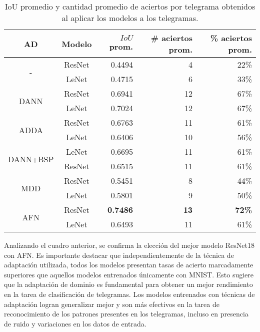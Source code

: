 \begin{table}[H]
    \centering
    \begin{tabular}{cc|rrr}
        \toprule
        AD                           & Modelo & $IoU$ prom.     & \# aciertos prom. & \% aciertos prom. \\
        \midrule
        \multirow[c]{2}{*}{-}        & ResNet & 0.4494          & 4                 & 22\%              \\
                                     & LeNet  & 0.4715          & 6                 & 33\%              \\\hline
        \multirow[c]{2}{*}{DANN}     & ResNet & 0.6941          & 12                & 67\%              \\
                                     & LeNet  & 0.7024          & 12                & 67\%              \\\hline
        \multirow[c]{2}{*}{ADDA}     & ResNet & 0.6763          & 11                & 61\%              \\
                                     & LeNet  & 0.6406          & 10                & 56\%              \\\hline
        \multirow[c]{2}{*}{DANN+BSP} & LeNet  & 0.6695          & 11                & 61\%              \\
                                     & ResNet & 0.6515          & 11                & 61\%              \\\hline
        \multirow[c]{2}{*}{MDD}      & ResNet & 0.5451          & 8                 & 44\%              \\
                                     & LeNet  & 0.5801          & 9                 & 50\%              \\\hline
        \multirow[c]{2}{*}{AFN}      & ResNet & \textbf{0.7486} & \textbf{13}       & \textbf{72\%}     \\
                                     & LeNet  & 0.6493          & 11                & 61\%              \\
        \bottomrule
    \end{tabular}
    \caption[IoU y aciertos por modelo]{IoU promedio y cantidad promedio de aciertos por telegrama obtenidos al aplicar los modelos a los telegramas.}
    \label{tab:iou-cant-aciertos-en-telegramas}
\end{table}

Analizando el cuadro anterior, se confirma la elección del mejor modelo ResNet18 con AFN. Es importante destacar que
independientemente de la técnica de adaptación utilizada, todos los modelos presentan tasas de acierto marcadamente
superiores que aquellos modelos entrenados únicamente con MNIST. Esto sugiere que la adaptación de dominio es
fundamental para obtener un mejor rendimiento en la tarea de clasificación de telegramas. Los modelos entrenados con
técnicas de adaptación logran generalizar mejor y son más efectivos en la tarea de reconocimiento de los patrones
presentes en los telegramas, incluso en presencia de ruido y variaciones en los datos de entrada.

